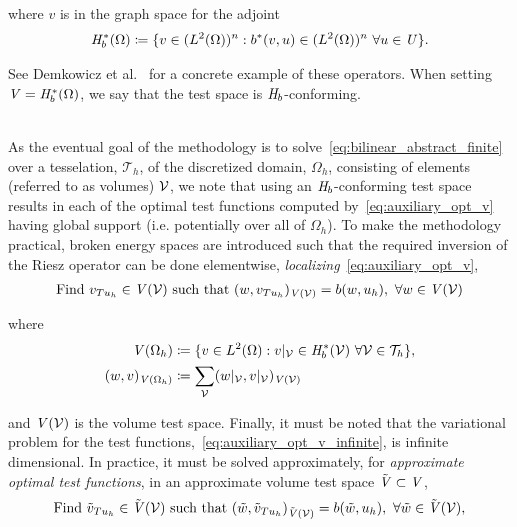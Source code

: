 where $v$ is in the graph space for the adjoint
\begin{align}
\mathit{{{H}}}_b^*(\Omega) \coloneqq
\{ v \in (L^2(\Omega))^n : b^*(v,u) \in (L^2(\Omega))^n\ \forall u \in \mathit{{{U}}} \}.
\end{align}

See Demkowicz et al.~\cite[eq. ()]{Demkowicz2014_overview} for a concrete example of these operators.
When setting $\mathit{{{V}}} = \mathit{{{H}}}_b^*(\Omega)$, we say that the test space is $\mathit{{{H}}}_b$-conforming.
\\~

As the eventual goal of the methodology is to solve~\eqref{eq:bilinear_abstract_finite} over a tesselation,
$\mathcal{T}_h$, of the discretized domain, $\Omega_h$, consisting of elements (referred to as volumes) $\mathcal{{{V}}}$, we
note that using an $\mathit{{{H}}}_b$-conforming test space results in each of the optimal test functions computed
by~\eqref{eq:auxiliary_opt_v} having global support (i.e. potentially over all of $\Omega_h$).  To make the methodology
practical, broken energy spaces are introduced such that the required inversion of the Riesz operator can be done
elementwise, \emph{localizing}~\eqref{eq:auxiliary_opt_v},
\begin{align} \label{eq:auxiliary_opt_v_infinite}
\text{Find}\ v_{T u_h} \in \mathit{{{V}}}(\mathcal{{{V}}})\ \text{such that}\
(w,v_{T u_h})_{\mathit{{{V}}}(\mathcal{{{V}}})} = b(w,u_h),\ \forall w \in \mathit{{{V}}}(\mathcal{{{V}}})
\end{align}

where 
\begin{align}
\mathit{{{V}}}(\Omega_h) 
&\coloneqq
\{ v \in L^2(\Omega) : v|_{\mathcal{{{V}}}} \in \mathit{{{H}}}_b^*(\mathcal{{{V}}})\ \forall \mathcal{{{V}}} \in \mathcal{T}_h \}, \\
(w,v)_{\mathit{{{V}}}(\Omega_h)}
&\coloneqq
\sum_{\mathcal{{{V}}}} (w|_{\mathcal{{{V}}}},v|_{\mathcal{{{V}}}})_{\mathit{{{V}}}(\mathcal{{{V}}})}
\end{align}

and $\mathit{{{V}}}(\mathcal{{{V}}})$ is the volume test space. Finally, it must be noted that the variational problem for the test
functions,~\eqref{eq:auxiliary_opt_v_infinite}, is infinite dimensional. In practice, it must be solved approximately, for
\textit{approximate optimal test functions}, in an approximate volume test space $\tilde{\mathit{{{V}}}} \subset \mathit{{{V}}}$,
\begin{align} \label{eq:auxiliary_opt_v_finite}
\text{Find}\ \tilde{v}_{T u_h} \in \afspace{V}(\fe{V})\ \text{such that}\
(\tilde{w},\tilde{v}_{T u_h})_{\afspace{V}(\fe{V})} = b(\tilde{w},u_h),\ \forall \tilde{w} \in \afspace{V}(\fe{V}),
\end{align}

